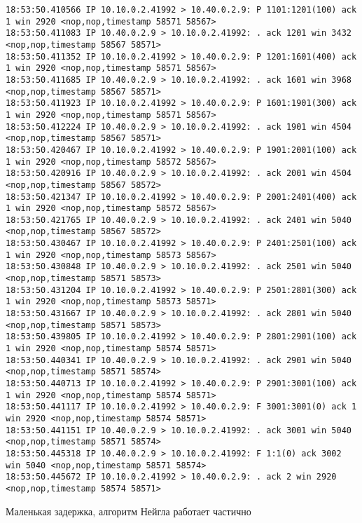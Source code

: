 \documentclass[a4paper,12pt]{article}
\begin{document}
\begin{lstlisting}
18:53:50.410566 IP 10.10.0.2.41992 > 10.40.0.2.9: P 1101:1201(100) ack 1 win 2920 <nop,nop,timestamp 58571 58567>
18:53:50.411083 IP 10.40.0.2.9 > 10.10.0.2.41992: . ack 1201 win 3432 <nop,nop,timestamp 58567 58571>
18:53:50.411352 IP 10.10.0.2.41992 > 10.40.0.2.9: P 1201:1601(400) ack 1 win 2920 <nop,nop,timestamp 58571 58567>
18:53:50.411685 IP 10.40.0.2.9 > 10.10.0.2.41992: . ack 1601 win 3968 <nop,nop,timestamp 58567 58571>
18:53:50.411923 IP 10.10.0.2.41992 > 10.40.0.2.9: P 1601:1901(300) ack 1 win 2920 <nop,nop,timestamp 58571 58567>
18:53:50.412224 IP 10.40.0.2.9 > 10.10.0.2.41992: . ack 1901 win 4504 <nop,nop,timestamp 58567 58571>
18:53:50.420467 IP 10.10.0.2.41992 > 10.40.0.2.9: P 1901:2001(100) ack 1 win 2920 <nop,nop,timestamp 58572 58567>
18:53:50.420916 IP 10.40.0.2.9 > 10.10.0.2.41992: . ack 2001 win 4504 <nop,nop,timestamp 58567 58572>
18:53:50.421347 IP 10.10.0.2.41992 > 10.40.0.2.9: P 2001:2401(400) ack 1 win 2920 <nop,nop,timestamp 58572 58567>
18:53:50.421765 IP 10.40.0.2.9 > 10.10.0.2.41992: . ack 2401 win 5040 <nop,nop,timestamp 58567 58572>
18:53:50.430467 IP 10.10.0.2.41992 > 10.40.0.2.9: P 2401:2501(100) ack 1 win 2920 <nop,nop,timestamp 58573 58567>
18:53:50.430848 IP 10.40.0.2.9 > 10.10.0.2.41992: . ack 2501 win 5040 <nop,nop,timestamp 58571 58573>
18:53:50.431204 IP 10.10.0.2.41992 > 10.40.0.2.9: P 2501:2801(300) ack 1 win 2920 <nop,nop,timestamp 58573 58571>
18:53:50.431667 IP 10.40.0.2.9 > 10.10.0.2.41992: . ack 2801 win 5040 <nop,nop,timestamp 58571 58573>
18:53:50.439805 IP 10.10.0.2.41992 > 10.40.0.2.9: P 2801:2901(100) ack 1 win 2920 <nop,nop,timestamp 58574 58571>
18:53:50.440341 IP 10.40.0.2.9 > 10.10.0.2.41992: . ack 2901 win 5040 <nop,nop,timestamp 58571 58574>
18:53:50.440713 IP 10.10.0.2.41992 > 10.40.0.2.9: P 2901:3001(100) ack 1 win 2920 <nop,nop,timestamp 58574 58571>
18:53:50.441117 IP 10.10.0.2.41992 > 10.40.0.2.9: F 3001:3001(0) ack 1 win 2920 <nop,nop,timestamp 58574 58571>
18:53:50.441151 IP 10.40.0.2.9 > 10.10.0.2.41992: . ack 3001 win 5040 <nop,nop,timestamp 58571 58574>
18:53:50.445318 IP 10.40.0.2.9 > 10.10.0.2.41992: F 1:1(0) ack 3002 win 5040 <nop,nop,timestamp 58571 58574>
18:53:50.445672 IP 10.10.0.2.41992 > 10.40.0.2.9: . ack 2 win 2920 <nop,nop,timestamp 58574 58571>
\end{lstlisting}

Маленькая задержка, алгоритм Нейгла работает частично
\end{document}
